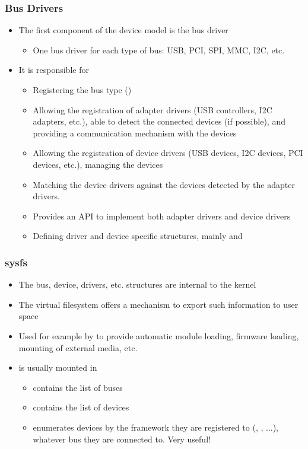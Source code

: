 \begin{frame}
  \frametitle{Bus Drivers}
  \begin{itemize}
  \item The first component of the device model is the bus driver
    \begin{itemize}
    \item One bus driver for each type of bus: USB, PCI, SPI, MMC,
      I2C, etc.
    \end{itemize}
  \item It is responsible for
    \begin{itemize}
    \item Registering the bus type ()
    \item Allowing the registration of adapter drivers (USB
      controllers, I2C adapters, etc.), able to detect the
      connected devices (if possible), and providing a
      communication mechanism with the devices
    \item Allowing the registration of device drivers (USB devices,
      I2C devices, PCI devices, etc.), managing the devices
    \item Matching the device drivers against the devices detected by
      the adapter drivers.
    \item Provides an API to implement both adapter drivers and device drivers
    \item Defining driver and device specific structures, mainly
       and 
    \end{itemize}
  \end{itemize}
\end{frame}


\begin{frame}
  \frametitle{sysfs}
  \begin{itemize}
  \item The bus, device, drivers, etc. structures are internal to the
    kernel
  \item The  virtual filesystem offers a mechanism to
    export such information to user space
  \item Used for example by  to provide automatic module loading,
    firmware loading, mounting of external media, etc.
  \item {} is usually mounted in 
    \begin{itemize}
    \item {} contains the list of buses
    \item {} contains the list of devices
    \item {} enumerates devices by the framework they are
          registered to (, , ...),
          whatever bus they are connected to. Very useful!
    \end{itemize}
  \end{itemize}
\end{frame}

